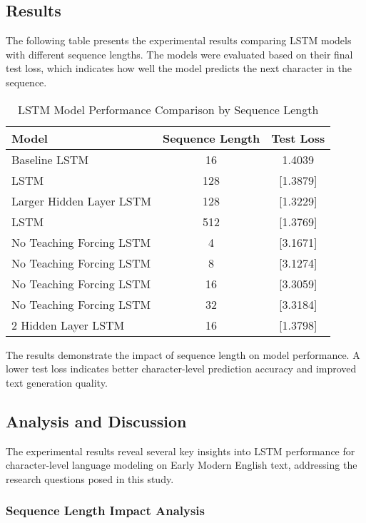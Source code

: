 \documentclass[12pt]{article}
\begin{document}
\subsection{Results}
\label{subsec:results}

The following table presents the experimental results comparing LSTM models with different sequence lengths. The models were evaluated based on their final test loss, which indicates how well the model predicts the next character in the sequence.

\begin{table}[h]
\centering
\begin{tabular}{|l|c|c|}
\hline
\textbf{Model} & \textbf{Sequence Length} & \textbf{Test Loss} \\
\hline
Baseline LSTM & 16 & 1.4039 \\
LSTM & 128 & [1.3879] \\
Larger Hidden Layer LSTM & 128 & [1.3229] \\
LSTM & 512 & [1.3769] \\
No Teaching Forcing LSTM & 4 & [3.1671] \\
No Teaching Forcing LSTM & 8 & [3.1274] \\
No Teaching Forcing LSTM & 16 & [3.3059] \\
No Teaching Forcing LSTM & 32 & [3.3184] \\
2 Hidden Layer LSTM & 16 & [1.3798] \\
\hline
\end{tabular}
\caption{LSTM Model Performance Comparison by Sequence Length}
\label{tab:lstm_results}
\end{table}

The results demonstrate the impact of sequence length on model performance. A lower test loss indicates better character-level prediction accuracy and improved text generation quality.

\subsection{Analysis and Discussion}

The experimental results reveal several key insights into LSTM performance for character-level language modeling on Early Modern English text, addressing the research questions posed in this study.

\subsubsection{Sequence Length Impact Analysis}
\end{document}
